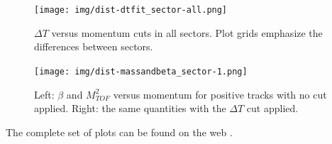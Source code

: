 \clearpage\newpage

\begin{figure}[ht]
	\centering
		\texttt{[image: img/dist-dtfit\_sector-all.png]}
		\caption{$\Delta T$ versus momentum cuts in all sectors. Plot grids
					emphasize the differences between sectors.}
		\label{fig:dt_vs_mom_all_sectors}
\end{figure}

\clearpage\newpage

\begin{figure}[ht]
	\centering
		\texttt{[image: img/dist-massandbeta\_sector-1.png]}
		\caption{Left: $\beta$ and $M_{TOF}^2$ versus momentum for positive
					tracks with no cut applied. Right: the same quantities with the
					$\Delta T$ cut applied.}
		\label{fig:mass_beta_vs_p_sect5}
\end{figure}

The complete set of plots can be found on the web \cite{bib:pi0_resonance_id_proton}.


\clearpage







